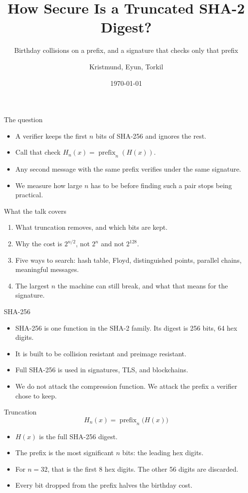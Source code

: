 \documentclass[aspectratio=169,11pt]{beamer}
\title{How Secure Is a Truncated SHA-2 Digest?}
\subtitle{Birthday collisions on a prefix, and a signature that checks only that prefix}
\author{Kristmund, Ey{\dh}un, Torkil}
\institute{Data Security}
\date{\today}
\newcommand{\Hn}{H_{n}}
\newcommand{\prefix}{\operatorname{prefix}}
\begin{document}
\begin{frame}
  \titlepage
\end{frame}

\begin{frame}{The question}
  \begin{itemize}
    \item A verifier keeps the first \(n\) bits of SHA-256 and ignores the rest.
    \item Call that check \(\Hn(x) = \prefix_{n}(H(x))\).
    \item Any second message with the same prefix verifies under the same signature.
    \item We measure how large \(n\) has to be before finding such a pair stops being practical.
  \end{itemize}
\end{frame}

\begin{frame}{What the talk covers}
  \begin{enumerate}
    \item What truncation removes, and which bits are kept.
    \item Why the cost is \(2^{n/2}\), not \(2^{n}\) and not \(2^{128}\).
    \item Five ways to search: hash table, Floyd, distinguished points, parallel chains, meaningful messages.
    \item The largest \(n\) the machine can still break, and what that means for the signature.
  \end{enumerate}
\end{frame}

\begin{frame}{SHA-256}
  \begin{itemize}
    \item SHA-256 is one function in the SHA-2 family. Its digest is 256 bits, 64 hex digits.
    \item It is built to be collision resistant and preimage resistant.
    \item Full SHA-256 is used in signatures, TLS, and blockchains.
    \item We do not attack the compression function. We attack the prefix a verifier chose to keep.
  \end{itemize}
\end{frame}

\begin{frame}{Truncation}
  \[
    \Hn(x) = \prefix_{n}\bigl(H(x)\bigr)
  \]
  \begin{itemize}
    \item \(H(x)\) is the full SHA-256 digest.
    \item The prefix is the most significant \(n\) bits: the leading hex digits.
    \item For \(n = 32\), that is the first 8 hex digits. The other 56 digits are discarded.
    \item Every bit dropped from the prefix halves the birthday cost.
  \end{itemize}
\end{frame}
\end{document}
